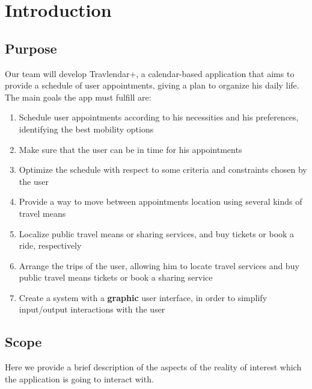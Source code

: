 \chapter{Introduction}

\section{Purpose}

Our team will develop Travlendar+, a calendar-based application that aims to provide a schedule of user appointments, giving a plan to organize his daily life.
The main goals the app must fulfill are:
\begin{enumerate}
\item Schedule user appointments according to his necessities and his preferences, identifying the best mobility options
\item Make sure that the user can be in time for his appointments
\item Optimize the schedule with respect to some criteria and constraints chosen by the user
\item Provide a way to move between appointments location using several kinds of travel means
\item Localize public travel means or sharing services, and buy tickets or book a ride, respectively
\item Arrange the trips of the user, allowing him to locate travel services and buy public travel means tickets or book a sharing service
\item Create a system with a \textbf{graphic} user interface, in order to simplify input/output interactions with the user
\end{enumerate}

\section{Scope}
Here we provide a brief description of the aspects of the reality of interest which the application is going to interact with.

